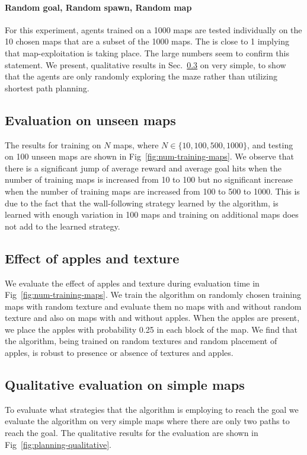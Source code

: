 \paragraph{Random goal, Random spawn, Random map}
For this experiment, agents trained on a 1000 maps are tested individually on the 10 chosen maps that are a subset of the 1000 maps.
The \LatencyOneGtOne{} is close to 1 implying that map-exploitation is taking place.
The large \DistanceInefficiency{} numbers seem to confirm this statement.
We present, qualitative results in  Sec.~\ref{sec:qualitative-simple} on very simple, to show that the agents are only randomly exploring the maze rather than utilizing shortest path planning.

\subsection{Evaluation on unseen maps}
The results for training on $N$ maps, where $N \in \{10, 100, 500, 1000\}$, and testing on 100 unseen maps are shown in Fig~\ref{fig:num-training-maps}.
We observe that there is a significant jump of average reward and average goal hits when the number of training maps is increased from 10 to 100 but no significant increase when the number of training maps are increased from 100 to 500 to 1000.
This is due to the fact that the wall-following strategy learned by the algorithm,
is learned with enough variation in 100 maps and training on additional maps does not add to the learned strategy.

\subsection{Effect of apples and texture}
We evaluate the effect of apples and texture during evaluation time in Fig~\ref{fig:num-training-maps}.
We train the algorithm on randomly chosen training maps with random texture and evaluate them no maps with and without random texture and also on maps with and without apples. When the apples are present, we place the apples with probability 0.25 in each block of the map.
We find that the algorithm, being trained on random textures and random placement of apples, is robust to presence or absence of textures and apples.


\subsection{Qualitative evaluation on simple maps}
\label{sec:qualitative-simple}
To evaluate what strategies that the algorithm is employing to reach the
goal we evaluate the algorithm on very simple maps where there are only two
paths to reach the goal. The qualitative results for the evaluation are shown
in Fig~\ref{fig:planning-qualitative}.

